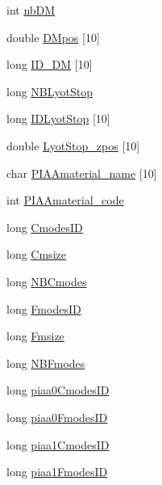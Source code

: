 \begin{DoxyCompactItemize}
\item 
int \hyperlink{structOPTPIAACMCDESIGN_abcbc2dfd1fde61c341f2689b1ed810dd}{nb\+D\+M}
\item 
double \hyperlink{structOPTPIAACMCDESIGN_ad508d17e469e18e4d2d8034bf0f23ea6}{D\+Mpos} \mbox{[}10\mbox{]}
\item 
long \hyperlink{structOPTPIAACMCDESIGN_a01002138c2aeb8f60ce18ab70bac6a15}{I\+D\+\_\+\+D\+M} \mbox{[}10\mbox{]}
\item 
long \hyperlink{structOPTPIAACMCDESIGN_aacf0223dec146b41ded13305b83c8ba6}{N\+B\+Lyot\+Stop}
\item 
long \hyperlink{structOPTPIAACMCDESIGN_a58b78571969e6a7a7d33a1439f264889}{I\+D\+Lyot\+Stop} \mbox{[}10\mbox{]}
\item 
double \hyperlink{structOPTPIAACMCDESIGN_ac58466d4fb98041f6a1279ce0e1092b1}{Lyot\+Stop\+\_\+zpos} \mbox{[}10\mbox{]}
\item 
char \hyperlink{structOPTPIAACMCDESIGN_abf3280f1ad15a23b5cf9f05942ca6d69}{P\+I\+A\+Amaterial\+\_\+name} \mbox{[}10\mbox{]}
\item 
int \hyperlink{structOPTPIAACMCDESIGN_a9fc6f0b8de4e0e7fe0694cd8f4e827e1}{P\+I\+A\+Amaterial\+\_\+code}
\item 
long \hyperlink{structOPTPIAACMCDESIGN_a34261c3f4264eb64be04cacd186aa1fc}{Cmodes\+I\+D}
\item 
long \hyperlink{structOPTPIAACMCDESIGN_a0943c7f88d6cc19f0d93aec976c33abf}{Cmsize}
\item 
long \hyperlink{structOPTPIAACMCDESIGN_a8206d0c4c019d9c2a6dda4d22cf7d8a6}{N\+B\+Cmodes}
\item 
long \hyperlink{structOPTPIAACMCDESIGN_a6b13c1628f90db964d8279de9aee4f23}{Fmodes\+I\+D}
\item 
long \hyperlink{structOPTPIAACMCDESIGN_a0e84939f7dbafe942bc7725bd6ddfa8e}{Fmsize}
\item 
long \hyperlink{structOPTPIAACMCDESIGN_ac46c632c680659b8c588701a497dbb4b}{N\+B\+Fmodes}
\item 
long \hyperlink{structOPTPIAACMCDESIGN_a9b381fe9d31e74c5306577c8ca59116b}{piaa0\+Cmodes\+I\+D}
\item 
long \hyperlink{structOPTPIAACMCDESIGN_a9101237f5e1b7af8a40014685cb399b9}{piaa0\+Fmodes\+I\+D}
\item 
long \hyperlink{structOPTPIAACMCDESIGN_aa59c49ac1d770c1ee0e3bce22e4d5863}{piaa1\+Cmodes\+I\+D}
\item 
long \hyperlink{structOPTPIAACMCDESIGN_a5fa43c209dc396f65f2d74d3bb275e75}{piaa1\+Fmodes\+I\+D}
\item 

\end{DoxyCompactItemize}
